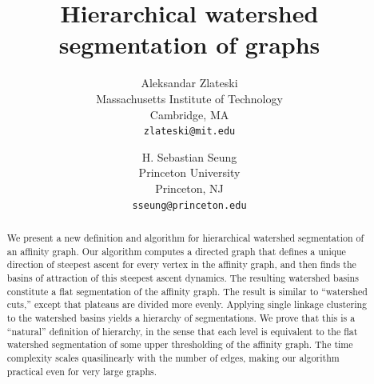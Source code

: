 \documentclass{article}
\begin{document}

\title{Hierarchical watershed segmentation of graphs}

\author{
Aleksandar Zlateski\\ Massachusetts Institute of Technology\\ Cambridge, MA\\
{\tt\small zlateski@mit.edu}
\and
H. Sebastian Seung\\ Princeton University\\ Princeton, NJ\\
{\tt\small sseung@princeton.edu}
}



\maketitle



\begin{abstract}
We present a new definition and algorithm for hierarchical watershed
segmentation of an affinity graph.  Our algorithm computes a directed
graph that defines a unique direction of steepest ascent for every
vertex in the affinity graph, and then finds the basins of attraction
of this steepest ascent dynamics.
The resulting watershed basins constitute a flat segmentation of the
affinity graph.  The result is similar to ``watershed cuts,'' except
that plateaus are divided more evenly.  Applying
single linkage clustering to the watershed basins yields a hierarchy
of segmentations.  We prove that this is a ``natural'' definition of
hierarchy, in the sense that each level is equivalent to the flat
watershed segmentation of some upper thresholding of the affinity
graph. The time complexity scales quasilinearly with the number of
edges, making our algorithm practical even for very large graphs.
\end{abstract}
\end{document}
